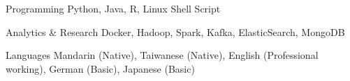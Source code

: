 


\begin{cvskills}


\cvskill
{Programming} %
{Python, Java, R, Linux Shell Script} %


\cvskill
{Analytics \& Research} %
{Docker, Hadoop, Spark, Kafka, ElasticSearch, MongoDB} %


\cvskill
{Languages} %
{Mandarin (Native), Taiwanese (Native), English (Professional working), German (Basic), Japanese (Basic)} %


\end{cvskills}